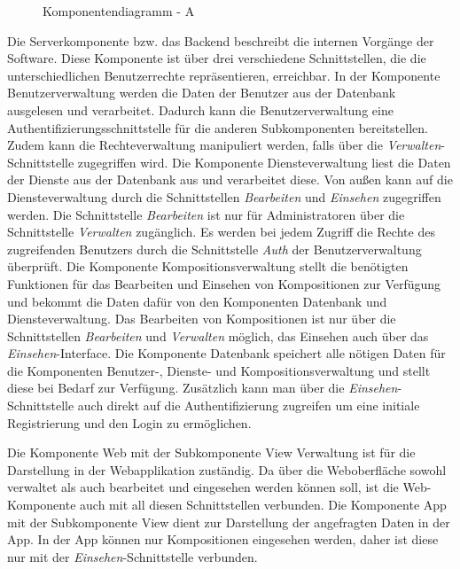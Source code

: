 \begin{figure}[h]
	\centering
	\caption{Komponentendiagramm - A}
	\label{fig:komponentendiagramm-a}
\end{figure}


Die Serverkomponente bzw. das Backend beschreibt die internen Vorgänge der Software.
Diese Komponente ist über drei verschiedene Schnittstellen, die die unterschiedlichen
Benutzerrechte repräsentieren, erreichbar.
In der Komponente Benutzerverwaltung werden die Daten der Benutzer aus der Datenbank ausgelesen und verarbeitet.
Dadurch kann die Benutzerverwaltung eine Authentifizierungsschnittstelle für die anderen Subkomponenten bereitstellen.
Zudem kann die Rechteverwaltung manipuliert werden, falls über die \textit{Verwalten}-Schnittstelle zugegriffen wird.
Die Komponente Diensteverwaltung liest die Daten der Dienste aus der Datenbank aus und verarbeitet diese.
Von außen kann auf die Diensteverwaltung durch die Schnittstellen \textit{Bearbeiten} und \textit{Einsehen} zugegriffen werden.
Die Schnittstelle \textit{Bearbeiten} ist nur für Administratoren über die Schnittstelle \textit{Verwalten} zugänglich.
Es werden bei jedem Zugriff die Rechte des zugreifenden Benutzers durch die Schnittstelle \textit{Auth} der Benutzerverwaltung überprüft.
Die Komponente Kompositionsverwaltung stellt die benötigten Funktionen für das Bearbeiten und Einsehen von Kompositionen zur Verfügung und bekommt die Daten dafür von den Komponenten Datenbank und Diensteverwaltung.
Das Bearbeiten von Kompositionen ist nur über die Schnittstellen \textit{Bearbeiten} und \textit{Verwalten} möglich, das Einsehen auch über das \textit{Einsehen}-Interface.
Die Komponente Datenbank speichert alle nötigen Daten für die Komponenten Benutzer-, Dienste- und Kompositionsverwaltung und stellt diese bei Bedarf zur Verfügung.
Zusätzlich kann man über die \textit{Einsehen}-Schnittstelle auch direkt auf die Authentifizierung zugreifen um eine initiale Registrierung und den Login zu ermöglichen.

Die Komponente Web mit der Subkomponente View Verwaltung ist für die Darstellung in der Webapplikation zuständig.
Da über die Weboberfläche sowohl verwaltet als auch bearbeitet und eingesehen werden können soll, ist die Web-Komponente auch mit all diesen Schnittstellen verbunden.
Die Komponente App mit der Subkomponente View dient zur Darstellung der angefragten Daten in der App.
In der App können nur Kompositionen eingesehen werden, daher ist diese nur mit der \textit{Einsehen}-Schnittstelle verbunden.
